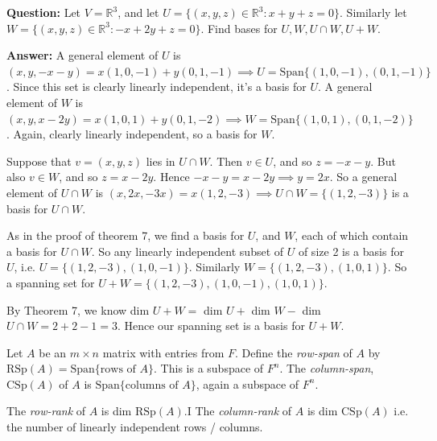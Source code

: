 \documentclass[10pt]{scrartcl}
\begin{document}
\begin{example} \textbf{Question:}  
 Let $V = \mathbb{R}^3$, and let $U= \{(x,y,z) \in \mathbb{R}^3: x + y + z = 0\}.$ Similarly let $W = \{(x,y,z) \in \mathbb{R}^3: -x + 2y + z = 0\}.$ Find bases for $U, W, U \cap W, U + W$. 

\textbf{Answer:} A general element of $U$ is $(x,y,-x-y) = x(1,0,-1) + y(0,1,-1) \implies U = \text{Span}\{(1,0,-1),(0,1,-1)\}$. Since this set is clearly linearly independent, it's a basis for $U$. A general element of $W$ is $(x,y,x-2y) = x(1,0,1) + y(0,1,-2) \implies W = \text{Span}\{(1,0,1),(0,1,-2)\}$. Again, clearly linearly independent, so a basis for $W$.

Suppose that $v = (x,y,z)$ lies in $U \cap W$. Then $v \in U$, and so $z = -x-y$. But also $v \in W$, and so $z = x - 2y$. Hence $-x-y = x-2y \implies y = 2x$. So a general element of $U \cap W$ is $(x,2x,-3x) = x(1,2,-3) \implies U\cap W = \{(1,2,-3)\} $ is a basis for $U\cap W$.


As in the proof of theorem 7, we find a basis for $U$, and $W$, each of which contain a basis for $U \cap W$. So any linearly independent subset of $U$ of size 2 is a basis for $U$, i.e. $U = \{(1,2,-3),(1,0,-1)\}$. Similarly $W = \{(1,2,-3),(1,0,1)\} $. So a spanning set for $U + W = \{(1,2,-3),(1,0,-1),(1,0,1)\}$.

By Theorem 7, we know dim $U+W = $ dim $U + $ dim $W - $ dim $U\cap W = 2 + 2 -1 = 3.$ Hence our spanning set is a basis for $U + W$.
\end{example}\vspace*{5pt}


\vspace*{5pt}

\begin{definition}Let $A$ be an $m \times n$ matrix with entries from $F$. Define the \emph{row-span} of $A$ by $\text{RSp}(A) = \text{Span}\{\text{rows of }A\}$. This is a subspace of $F^n$. The \emph{column-span}, $\text{CSp}(A)$ of $A$ is  $\text{Span}\{\text{columns of }A\}$, again a subspace of $F^n$.	

The \emph{row-rank} of $A$ is dim $\text{RSp}(A)$.I The \emph{column-rank} of $A$ is dim $\text{CSp}(A)$ i.e. the number of linearly independent rows / columns.
\end{definition}\vspace*{5pt}
\end{document}

